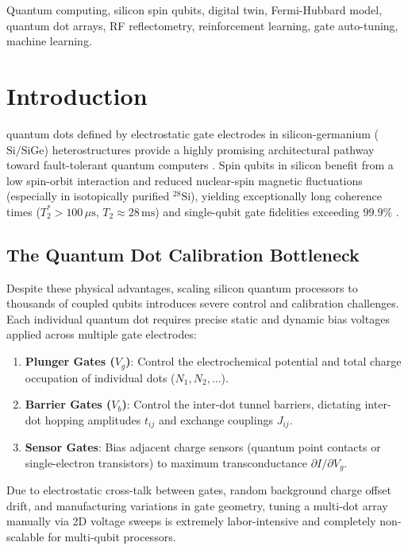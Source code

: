 \documentclass[journal,twocolumn,10pt]{IEEEtran}
\begin{document}
\begin{IEEEkeywords}
Quantum computing, silicon spin qubits, digital twin, Fermi-Hubbard model, quantum dot arrays, RF reflectometry, reinforcement learning, gate auto-tuning, machine learning.
\end{IEEEkeywords}

\section{Introduction}

 quantum dots defined by electrostatic gate electrodes in silicon-germanium ($\text{Si/SiGe}$) heterostructures provide a highly promising architectural pathway toward fault-tolerant quantum computers \cite{Zwanenburg2013}. Spin qubits in silicon benefit from a low spin-orbit interaction and reduced nuclear-spin magnetic fluctuations (especially in isotopically purified $\text{}^{28}\text{Si}$), yielding exceptionally long coherence times ($T_2^* > 100\,\mu\text{s}$, $T_2 \approx 28\,\text{ms}$) and single-qubit gate fidelities exceeding $99.9\%$ \cite{Veldhorst2014}.

\subsection{The Quantum Dot Calibration Bottleneck}
Despite these physical advantages, scaling silicon quantum processors to thousands of coupled qubits introduces severe control and calibration challenges. Each individual quantum dot requires precise static and dynamic bias voltages applied across multiple gate electrodes:
\begin{enumerate}
    \item \textbf{Plunger Gates ($V_g$)}: Control the electrochemical potential and total charge occupation of individual dots ($N_1, N_2, \dots$).
    \item \textbf{Barrier Gates ($V_b$)}: Control the inter-dot tunnel barriers, dictating inter-dot hopping amplitudes $t_{ij}$ and exchange couplings $J_{ij}$.
    \item \textbf{Sensor Gates}: Bias adjacent charge sensors (quantum point contacts or single-electron transistors) to maximum transconductance $\partial I / \partial V_g$.
\end{enumerate}

Due to electrostatic cross-talk between gates, random background charge offset drift, and manufacturing variations in gate geometry, tuning a multi-dot array manually via 2D voltage sweeps is extremely labor-intensive and completely non-scalable for multi-qubit processors.
\end{document}
